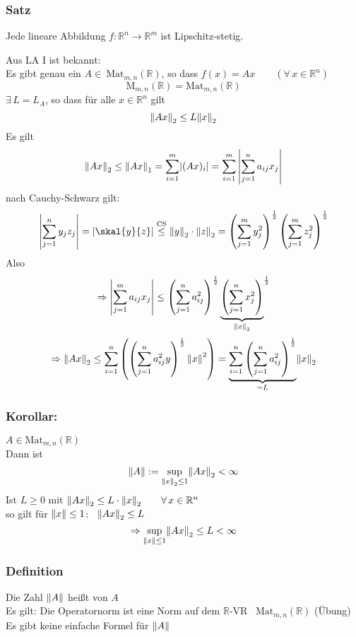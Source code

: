 \subsubsection{Satz} %
\label{ssub:satz}
Jede lineare Abbildung $f:\mathbb{R}^n \to \mathbb{R}^m$ ist Lipschitz-stetig.

 Aus LA I ist bekannt: \\
Es gibt genau ein $A \in \ \text{Mat}_{m,n}(\mathbb{R})$, so dass $f(x)=Ax \qquad (\forall\, x \in \mathbb{R}^n)$ 
\[
	\text{M}_{m,n}(\mathbb{R}) = \text{Mat}_{m,n}(\mathbb{R})
\]
$\exists \, L=L_A$, so dass für alle $x \in \mathbb{R}^n$ gilt 
\[
	\norm{Ax}_2 \leq L \norm{x}_2
\]
Es gilt 
\[
	\norm{Ax}_2 \leq \norm{Ax}_1 = \sum^{m}_{i=1} \abs{(Ax)_i} = \sum^{m}_{i=1} \left|\sum^{n}_{j=1} a_{ij}x_j \right| 
\]
nach Cauchy-Schwarz gilt:
\[
	\left| \sum^{n}_{j=1}y_jz_j \right | =\abs{\skal{y}{z}} \stackrel{\text{CS}}{\leq } \norm{y}_2 \cdot \norm{z}_2 = \left( \sum^{m}_{j=1}y_j^2 \right)^{\frac{1}{2}}
	 \left( \sum^{m}_{j=1}z_j^2 \right)^{\frac{1}{2}}
\]
Also 
\[
	\Rightarrow \left| \sum^{m}_{j=1}a_{ij}x_j \right| \leq \left( \sum^{n}_{j=1}a_{ij}^2 \right)^{\frac{1}{2}} \underset{\norm{x}_2}{\underbrace{
	\left ( \sum^{n}_{j=1}x_{j}^2 \right ) }}^{\frac{1}{2}}
\]
\[
	\Rightarrow \norm{Ax}_2 \leq \sum^{n}_{i=1} \left( \left( \sum^{n}_{j=1}a_{ij}^2y \right)^{\frac{1}{2}}\norm{x}^2 \right) = \underset{=L}{\underbrace{\sum^{n}_{i=1} \left( \sum^{n}_{j=1}a_{ij}^2 \right)^{\frac{1}{2}}}} \norm{x}_2
\] 
\bewende
\subsubsection{Korollar:} %
\label{ssub:korollar}
$A \in \text{Mat}_{m,n}(\mathbb{R})$ \\
Dann ist 
\[
	\norm{A}:= \sup\limits_{\norm{x}_2 \leq 1} \norm{Ax}_2 < \infty
\]
Ist $L \geq 0$ mit $\norm{Ax}_2 \leq L \cdot \norm{x}_2 \qquad \forall\, x \in \mathbb{R}^n$ \\ 
so gilt für $\norm{x}\leq 1$: \, $\norm{Ax}_2 \leq L$
\[
	\Rightarrow \sup\limits_{\norm{x}\leq 1}\norm{Ax}_2 \leq L < \infty
\]
 \bewende
\subsubsection[Operatornorm]{Definition} %
\label{ssub:definition}
Die Zahl $\norm{A}$ heißt  von $A$ \\
Es gilt: Die Operatornorm ist eine Norm auf dem $\mathbb{R}$-VR \, $\text{Mat}_{m,n}(\mathbb{R})$ \qquad (Übung) \\
Es gibt keine einfache Formel für $\norm{A}$

